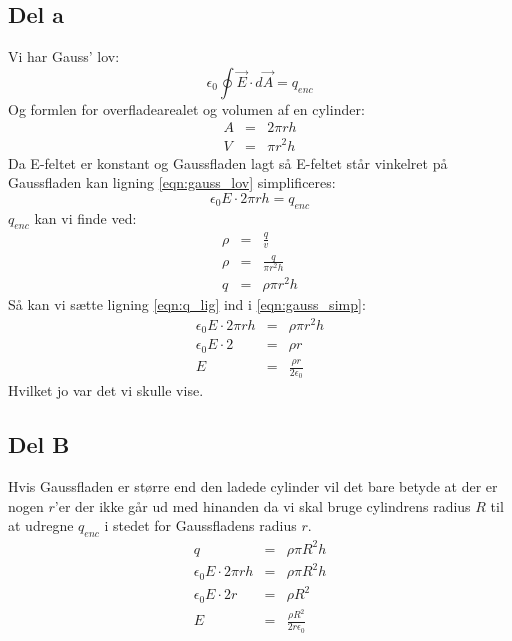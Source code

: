 \subsection{Del a} %
\label{sub:del_a}
Vi har Gauss' lov:
\begin{equation}
	\label{eqn:gauss_lov}
	\epsilon _0 \oint \vec{E} \cdot d\vec{A} = q_{enc}
\end{equation}
Og formlen for overfladearealet og volumen af en cylinder:
\begin{eqnarray}
	A &=& 2\pi rh \\
	V &=& \pi r^2 h
\end{eqnarray}
Da E-feltet er konstant og Gaussfladen lagt så E-feltet står vinkelret på Gaussfladen kan ligning \ref{eqn:gauss_lov} simplificeres:
\begin{equation}
	\label{eqn:gauss_simp}
	\epsilon _0 E \cdot 2\pi rh = q_{enc}
\end{equation}
$q_{enc}$ kan vi finde ved:
\begin{eqnarray}
	\label{eqn:q_lig}
	\rho &=& \frac{q}{v} \nonumber \\
	\rho &=& \frac{q}{\pi r^2 h} \nonumber \\
	q &=& \rho \pi r^2 h
\end{eqnarray}
Så kan vi sætte ligning \ref{eqn:q_lig} ind i \ref{eqn:gauss_simp}:
\begin{eqnarray}
	\epsilon _0 E \cdot 2\pi rh &=& \rho \pi r^2 h \nonumber \\
	\epsilon _0 E \cdot 2 &=& \rho r \nonumber \\
	E &=& \frac{\rho r}{2\epsilon _0}
\end{eqnarray}
Hvilket jo var det vi skulle vise.
\newpage

\subsection{Del B} %
\label{sub:del_b}
Hvis Gaussfladen er større end den ladede cylinder vil det bare betyde at der er nogen $r$'er der ikke går ud med hinanden da vi skal bruge cylindrens radius $R$  til at udregne $q_{enc}$ i stedet for Gaussfladens radius $r$.
\begin{eqnarray}
	q &=& \rho \pi R^2 h \nonumber \\
	\epsilon _0 E \cdot 2\pi rh &=& \rho \pi R^2 h \nonumber \\
	\epsilon _0 E \cdot 2r &=& \rho R^2 \nonumber \\
	E &=& \frac{\rho R^2}{2r\epsilon _0}
\end{eqnarray}
